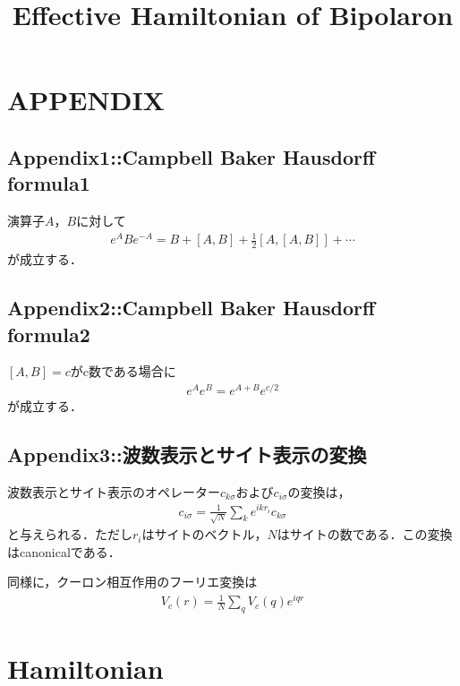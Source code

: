 \documentclass[a4j]{jarticle}
\title{Effective Hamiltonian of Bipolaron}
\begin{document}
\section{APPENDIX}
\subsection{Appendix1::Campbell Baker Hausdorff formula1}
演算子$A$，$B$に対して
\begin{align}
 e^ABe^{-A}=B+\left[A,B\right]+\frac{1}{2}\left[A,\left[A,B\right]\right]+\cdots
\end{align}
が成立する．

\subsection{Appendix2::Campbell Baker Hausdorff formula2}
$[A,B]=c$がc数である場合に
\begin{align}
 e^Ae^B=e^{A+B}e^{c/2}
\end{align}
が成立する．

\subsection{Appendix3::波数表示とサイト表示の変換}
波数表示とサイト表示のオペレーター$c_{k\sigma}$および$c_{i\sigma}$の変換は，
\begin{align}
 c_{i\sigma}=\frac{1}{\sqrt{N}}\sum_{k}e^{ikr_i}c_{k\sigma}
\end{align}
と与えられる．ただし$r_i$はサイトのベクトル，$N$はサイトの数である．この変換はcanonicalである．

同様に，クーロン相互作用のフーリエ変換は
\begin{align}
 V_c(r)=\frac{1}{N}\sum_{q}V_c(q)e^{iqr}
\end{align}








\section{Hamiltonian}
\end{document}
